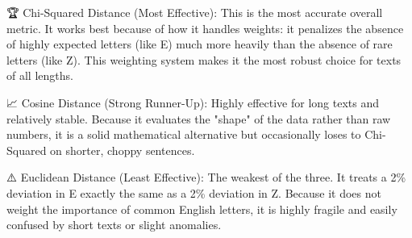 🏆 Chi-\/\+Squared Distance (Most Effective):\+ This is the most accurate overall metric. It works best because of how it handles weights:\+ it penalizes the absence of highly expected letters (like \textquotesingle{}E\textquotesingle{}) much more heavily than the absence of rare letters (like \textquotesingle{}Z\textquotesingle{}). This weighting system makes it the most robust choice for texts of all lengths.

📈 Cosine Distance (Strong Runner-\/\+Up):\+ Highly effective for long texts and relatively stable. Because it evaluates the "{}shape"{} of the data rather than raw numbers, it is a solid mathematical alternative but occasionally loses to Chi-\/\+Squared on shorter, choppy sentences.

⚠️ Euclidean Distance (Least Effective):\+ The weakest of the three. It treats a 2\% deviation in \textquotesingle{}E\textquotesingle{} exactly the same as a 2\% deviation in \textquotesingle{}Z\textquotesingle{}. Because it does not weight the importance of common English letters, it is highly fragile and easily confused by short texts or slight anomalies. 